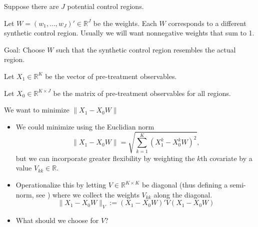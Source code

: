 \documentclass[notes,11pt, aspectratio=169]{beamer}
\newenvironment{wideitemize}{\itemize\addtolength{\itemsep}{10pt}}{\enditemize}
\begin{document}
\begin{frame}{}
    \begin{wideitemize}
        \item Suppose there are $J$ potential control regions. \pause 
        \item Let $W = (w_1, \ldots, w_J)' \in \mathbb R^J$ be the weights. Each $W$ corresponds to 
        a different synthetic control region. Usually we will want nonnegative 
        weights that sum to 1.\pause 
        \item Goal: Choose $W$ such that the synthetic control region resembles the actual region. \pause \medskip
        \begin{wideitemize}
            \item Let $X_1 \in \mathbb R^K$ be the vector of pre-treatment observables. 
            \item Let $X_0 \in \mathbb R^{K \times J}$ be the matrix of pre-treatment observables for all regions. 
            \item We want to minimize $\| X_1 - X_0 W\|$
        \end{wideitemize}
    \end{wideitemize}
\end{frame}

\begin{frame}{}
    \begin{itemize}
        \item We could minimize using the Euclidian norm
        \[ \| X_1 - X_0 W \| = \sqrt{\sum _{k=1}^K \left(X_1^k - X_0^k W\right) ^ 2 },\]
        but we can incorporate greater flexibility by weighting the $k$th covariate
        by a value $V_{kk} \in \mathbb R$. \pause
        \item Operationalize this by letting $V \in \mathbb R^{K \times K}$ be 
        diagonal (thus defining a semi-norm, see \cite{abadie_synthetic_2010}) 
        where we collect the weights $V_{kk}$ along the diagonal. 
        \[\|X_1 - X_0 W\|_V := (X_1 - X_0 W)' V (X_1 - X_0W)\] \pause  
        \item What should we choose for $V$? 
    \end{itemize}
\end{frame}
\end{document}
